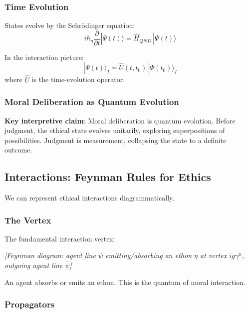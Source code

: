 \documentclass[12pt]{article}
\begin{document}
\subsubsection{Time Evolution}

States evolve by the Schr\"{o}dinger equation:
\begin{equation}
    i\hbar_\eta \frac{\partial}{\partial t} |\Psi(t)\rangle = \hat{H}_{QND} \,|\Psi(t)\rangle
\end{equation}

In the interaction picture:
\begin{equation}
    |\Psi(t)\rangle_I = \hat{U}(t, t_0) \,|\Psi(t_0)\rangle_I
\end{equation}
where $\hat{U}$ is the time-evolution operator.

\subsubsection{Moral Deliberation as Quantum Evolution}

\textbf{Key interpretive claim}: Moral deliberation is quantum evolution. Before judgment, the ethical state evolves unitarily, exploring superpositions of possibilities. Judgment is measurement, collapsing the state to a definite outcome.

\subsection{Interactions: Feynman Rules for Ethics}

We can represent ethical interactions diagrammatically.

\subsubsection{The Vertex}

The fundamental interaction vertex:

\begin{center}
\emph{[Feynman diagram: agent line $\psi$ emitting/absorbing an ethon $\eta$ at vertex $ig\gamma^\mu$, outgoing agent line $\bar{\psi}$]}
\end{center}

An agent absorbs or emits an ethon. This is the quantum of moral interaction.

\subsubsection{Propagators}
\end{document}
